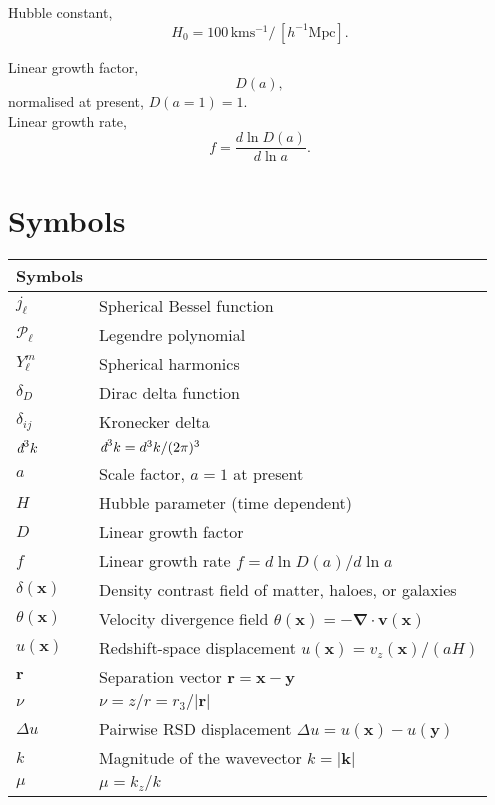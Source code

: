 \documentclass[a4paper,11pt, fleqn]{article}
\newcommand{\dbar}{\textit{\dj}}
\begin{document}
Hubble constant,
\begin{equation}
  H_0 = 100\,\mathrm{km}\mathrm{s}^{-1} / \,[h^{-1} \mathrm{Mpc}].
\end{equation}


Linear growth factor,
\begin{equation}
  D(a),
\end{equation}
normalised at present, $D(a=1) = 1$.\\

Linear growth rate,
\begin{equation}
  f = \frac{d\ln D(a)}{d\ln a}.
\end{equation}

%
%
\clearpage
\section{Symbols}

\begin{center}
  \begin{tabular}{ll}
    Symbols & \\
    \hline
    $j_\ell$ & Spherical Bessel function\\
    $\mathcal{P}_\ell$ & Legendre polynomial\\
    $Y_\ell^m$ & Spherical harmonics\\
    $\delta_D$ & Dirac delta function\\
    $\delta_{ij}$ & Kronecker delta\\
    $\dbar^3 k$ & $\dbar^3 k = d^3 k / (2\pi)^3$\\ 
    \hline
    $a$ & Scale factor, $a=1$ at present\\
    $H$ & Hubble parameter (time dependent)\\
    $D$ & Linear growth factor\\
    $f$ & Linear growth rate $f = d \ln D(a)/d\ln a$\\
    $\delta(\bm{x})$ & Density contrast field of matter, haloes, or galaxies\\
    
    $\theta(\bm{x})$ & Velocity divergence field
    $\theta(\bm{x}) = -\bm{\nabla} \cdot \bm{v}(\bm{x})$\\
    $u(\bm{x})$ & Redshift-space displacement $u(\bm{x}) = v_z(\bm{x})/(aH)$\\
    $\bm{r}$ & Separation vector $\bm{r} = \bm{x} - \bm{y}$\\
    $\nu$   & $\nu = z/r = r_3/|\bm{r}|$\\
    $\Delta u$ & Pairwise RSD displacement $\Delta u = u(\bm{x}) - u(\bm{y})$\\
    $k$ & Magnitude of the wavevector $k = |\bm{k}|$\\
    $\mu$ & $\mu=k_z/k$\\
    \hline
  \end{tabular}
\end{center}

%
%
%
\end{document}
